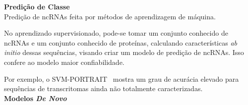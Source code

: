 

\textbf{Predição de Classe} \\

Predição de ncRNAs feita por métodos de aprendizagem de máquina.

No aprendizado supervisionado, pode-se tomar um conjunto conhecido de ncRNAs e um conjunto conhecido de proteínas, calculando características {\it ab initio} dessas sequências, visando criar um modelo de predição de ncRNAs. Isso confere ao modelo maior confiabilidade.

Por exemplo, o SVM-PORTRAIT~\citep{Arrial:2006,arrial2009screening:2009} mostra um grau de acurácia elevado para sequências de transcritomas ainda não totalmente caracterizadas.\\









\textbf{Modelos \textit{De Novo}} \\

